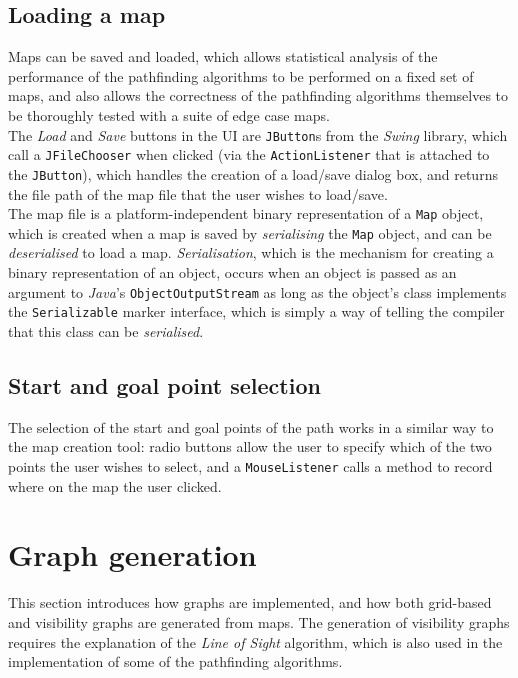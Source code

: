 \documentclass[12pt,notitlepage]{report}
\begin{document}
\subsection{Loading a map}
Maps can be saved and loaded, which allows statistical analysis of the performance of the pathfinding algorithms to be performed on a fixed set of maps, and also allows the correctness of the pathfinding algorithms themselves to be thoroughly tested with a suite of edge case maps.\\

\noindent
The {\em Load} and {\em Save} buttons in the UI are {\tt JButton}s from the {\em Swing} library, which call a {\tt JFileChooser} when clicked (via the {\tt ActionListener} that is attached to the {\tt JButton}), which handles the creation of a load/save dialog box, and returns the file path of the map file that the user wishes to load/save.\\

\noindent
The map file is a platform-independent binary representation of a {\tt Map} object, which is created when a map is saved by {\em serialising} the {\tt Map} object, and can be {\em deserialised} to load a map. {\em Serialisation}, which is the mechanism for creating a binary representation of an object, occurs when an object is passed as an argument to {\em Java}'s {\tt ObjectOutputStream} as long as the object's class implements the {\tt Serializable} marker interface, which is simply a way of telling the compiler that this class can be {\em serialised}.

\subsection{Start and goal point selection}
The selection of the start and goal points of the path works in a similar way to the map creation tool: radio buttons allow the user to specify which of the two points the user wishes to select, and a {\tt MouseListener} calls a method to record where on the map the user clicked.

\section{Graph generation}

This section introduces how graphs are implemented, and how both grid-based and visibility graphs are generated from maps. The generation of visibility graphs requires the explanation of the {\em Line of Sight} algorithm, which is also used in the implementation of some of the pathfinding algorithms.\\
\end{document}
